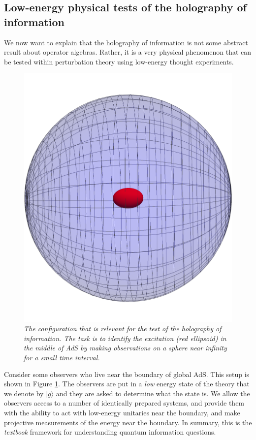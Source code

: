 \documentclass[12pt]{article}
\begin{document}
\subsection{Low-energy physical tests of the holography of information \label{lowenergy}}
We now want to explain that the holography of information is not some abstract result about operator algebras. Rather, it is a very physical phenomenon that can be tested within perturbation theory using low-energy thought experiments. 

\begin{figure}[!ht]
\begin{center}
\includegraphics[height=0.5\textheight]{detectorconfiguration.pdf}
\caption{\em The configuration that is relevant for the test of the holography of information. The task is to identify the excitation (red ellipsoid) in the middle of AdS by making observations on a sphere near infinity for a small time interval. \label{figdetectors}}
\end{center}
\end{figure}
Consider some observers who live near the boundary of global AdS. This setup is shown in Figure \ref{figdetectors}. The observers are put in a {\em low} energy state of the theory that we denote by $| g \rangle$  and they are  asked to determine what the state is. We allow the observers access to a number of identically prepared systems, and provide them with the ability to act with low-energy unitaries near the boundary, and make projective measurements of the energy near the boundary. In summary, this is the {\em textbook} framework for understanding quantum information questions.
\end{document}
